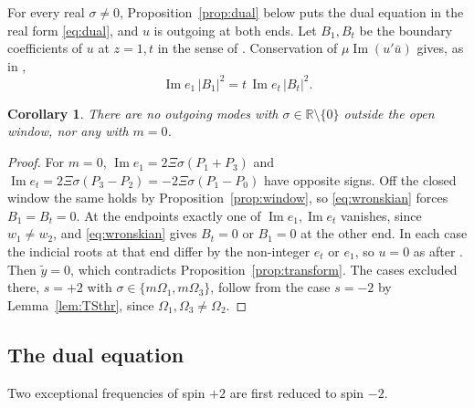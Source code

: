 \documentclass[11pt]{amsart}
\newtheorem{corollary}[theorem]{Corollary}
\theoremstyle{definition}
\theoremstyle{remark}
\numberwithin{equation}{section}
\newcommand{\R}{\mathbb{R}}
\renewcommand{\Im}{\operatorname{Im}}
\begin{document}
For every real $\sigma\ne0$, Proposition~\ref{prop:dual} below puts the dual equation in the real form
\eqref{eq:dual}, and $u$ is outgoing at both ends. Let $B_1,B_t$ be the boundary coefficients of $u$ at $z=1,t$ in
the sense of \cite[(3.5)]{Hin26}. Conservation of $\mu\Im(u'\bar u)$ gives, as in \cite[\S3]{Hin26},
\begin{equation}\label{eq:wronskian}
\Im e_1\,|B_1|^2=t\,\Im e_t\,|B_t|^2.
\end{equation}

\begin{corollary}\label{cor:outside}
There are no outgoing modes with $\sigma\in\R\setminus\{0\}$ outside the open window, nor any with $m=0$.
\end{corollary}
\begin{proof}
For $m=0$, $\Im e_1=2\Xi\sigma(P_1+P_3)$ and $\Im e_t=2\Xi\sigma(P_3-P_2)=-2\Xi\sigma(P_1-P_0)$ have opposite signs.
Off the closed window the same holds by Proposition~\ref{prop:window}, so \eqref{eq:wronskian} forces
$B_1=B_t=0$. At the endpoints exactly one of $\Im e_1,\Im e_t$ vanishes, since $w_1\ne w_2$, and
\eqref{eq:wronskian} gives $B_t=0$ or $B_1=0$ at the other end. In each case the indicial roots at that end differ by
the non-integer $e_t$ or $e_1$, so $u=0$ as after \cite[(3.6)]{Hin26}. Then $\tilde y=0$, which contradicts
Proposition~\ref{prop:transform}. The cases excluded there, $s=+2$ with $\sigma\in\{m\Omega_1,m\Omega_3\}$, follow from the case $s=-2$ by
Lemma~\ref{lem:TSthr}, since $\Omega_1,\Omega_3\ne\Omega_2$.
\end{proof}

\subsection{The dual equation}\label{subsec:dual}
Two exceptional frequencies of spin $+2$ are first reduced to spin $-2$.
\end{document}
